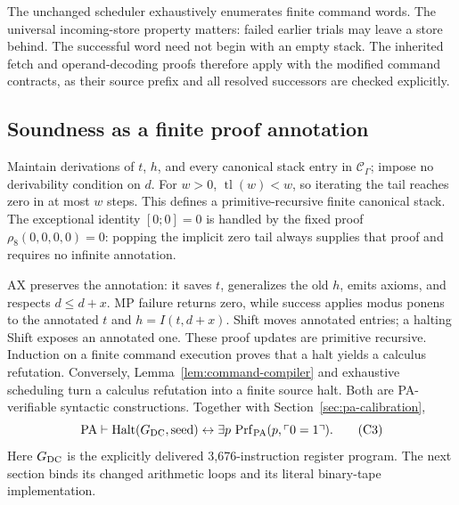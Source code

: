 The unchanged scheduler exhaustively enumerates finite command words.
The universal incoming-store property matters: failed earlier trials may
leave a store behind. The successful word need not begin with an empty
stack. The inherited fetch and operand-decoding proofs therefore apply
with the modified command contracts, as their source prefix and all
resolved successors are checked explicitly.

\subsection{Soundness as a finite proof annotation}

Maintain derivations of $t$, $h$, and every canonical stack entry in
$\mathcal C_\Gamma$; impose no derivability condition on $d$. For $w>0$,
$\operatorname{tl}(w)<w$, so iterating the tail reaches zero in at most
$w$ steps. This defines a primitive-recursive finite canonical stack.
The exceptional identity $[0;0]=0$ is handled by the fixed proof
$\rho_8(0,0,0,0)=0$: popping the implicit zero tail always supplies that
proof and requires no infinite annotation.

AX preserves the annotation: it saves $t$, generalizes the old $h$, emits
axioms, and respects $d\le d+x$. MP failure returns zero, while success
applies modus ponens to the annotated $t$ and $h=I(t,d+x)$. Shift moves
annotated entries; a halting Shift exposes an annotated one. These proof
updates are primitive recursive. Induction on a finite command execution
proves that a halt yields a calculus refutation. Conversely,
Lemma~\ref{lem:command-compiler} and exhaustive scheduling turn a calculus
refutation into a finite source halt. Both are PA-verifiable syntactic
constructions. Together with Section~\ref{sec:pa-calibration},
\[
 \mathrm{PA}\vdash \operatorname{Halt}(G_{\rm DC},\mathrm{seed})
 \leftrightarrow
 \exists p\,\operatorname{Prf}_{\mathrm{PA}}(p,\ulcorner0=1\urcorner).     \tag{C3}
\]
Here $G_{\rm DC}$ is the explicitly delivered 3,676-instruction register
program. The next section binds its changed arithmetic loops and its
literal binary-tape implementation.
